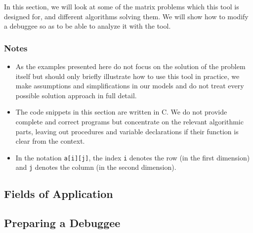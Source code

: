 In this section, we will look at some of the matrix problems which this tool is designed for, and different algorithms solving them. We will show how to modify a debuggee so as to be able to analyze it with the tool.

\subsubsection*{Notes}
\begin{itemize}
\item As the examples presented here do not focus on the solution of the problem itself but should only briefly illustrate how to use this tool in practice, we make assumptions and simplifications in our models and do not treat every possible solution approach in full detail.

\item The code snippets in this section are written in C. We do not provide complete and correct programs but concentrate on the relevant algorithmic parts, leaving out procedures and variable declarations if their function is clear from the context.

\item In the notation \texttt{a[i][j]}, the index \texttt{i} denotes the row (in the first dimension) and \texttt{j} denotes the column (in the second dimension).
\end{itemize}


\subsection{Fields of Application}


\subsection{Preparing a Debuggee}



